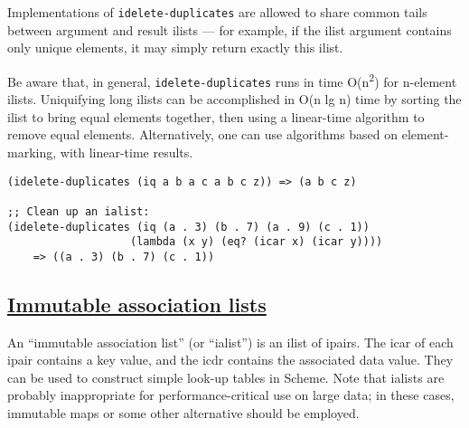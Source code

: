 \begin{description}
Implementations of \texttt{idelete-duplicates} are allowed to share
common tails between argument and result ilists --- for example, if the
ilist argument contains only unique elements, it may simply return
exactly this ilist.

Be aware that, in general, \texttt{idelete-duplicates} runs in time
O(n\textsuperscript{2}) for n-element ilists. Uniquifying long ilists
can be accomplished in O(n lg n) time by sorting the ilist to bring
equal elements together, then using a linear-time algorithm to remove
equal elements. Alternatively, one can use algorithms based on
element-marking, with linear-time results.

\begin{verbatim}
(idelete-duplicates (iq a b a c a b c z)) => (a b c z)

;; Clean up an ialist:
(idelete-duplicates (iq (a . 3) (b . 7) (a . 9) (c . 1))
                   (lambda (x y) (eq? (icar x) (icar y))))
    => ((a . 3) (b . 7) (c . 1))
\end{verbatim}
\end{description}

\subsection{\texorpdfstring{\href{}{Immutable association
lists}}{Immutable association lists}}\label{immutable-association-lists}

An ``immutable association list'' (or ``ialist'') is an ilist of ipairs.
The icar of each ipair contains a key value, and the icdr contains the
associated data value. They can be used to construct simple look-up
tables in Scheme. Note that ialists are probably inappropriate for
performance-critical use on large data; in these cases, immutable maps
or some other alternative should be employed.

